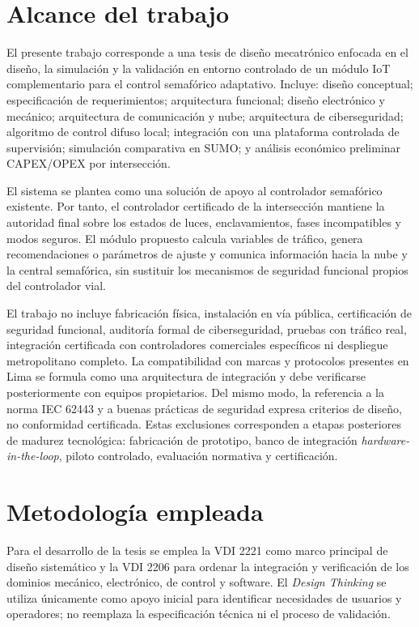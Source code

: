 \section{Alcance del trabajo}\label{sec:alcance}

El presente trabajo corresponde a una tesis de diseño mecatrónico enfocada en el diseño, la simulación y la
validación en entorno controlado de un módulo IoT complementario para el control semafórico adaptativo.
Incluye: diseño conceptual; especificación de requerimientos; arquitectura funcional; diseño electrónico y
mecánico; arquitectura de comunicación y nube; arquitectura de ciberseguridad; algoritmo de control difuso
local; integración con una plataforma controlada de supervisión; simulación comparativa en SUMO; y análisis
económico preliminar CAPEX/OPEX por intersección.

El sistema se plantea como una solución de apoyo al controlador semafórico existente. Por tanto, el
controlador certificado de la intersección mantiene la autoridad final sobre los estados de luces,
enclavamientos, fases incompatibles y modos seguros. El módulo propuesto calcula variables de tráfico,
genera recomendaciones o parámetros de ajuste y comunica información hacia la nube y la central semafórica,
sin sustituir los mecanismos de seguridad funcional propios del controlador vial.

El trabajo no incluye fabricación física, instalación en vía pública, certificación de seguridad funcional,
auditoría formal de ciberseguridad, pruebas con tráfico real, integración certificada con controladores
comerciales específicos ni despliegue metropolitano completo. La compatibilidad con marcas y protocolos
presentes en Lima se formula como una arquitectura de integración y debe verificarse posteriormente con
equipos propietarios. Del mismo modo, la referencia a la norma IEC 62443 y a buenas prácticas de seguridad
expresa criterios de diseño, no conformidad certificada. Estas exclusiones corresponden a etapas posteriores
de madurez tecnológica: fabricación de prototipo, banco de integración \textit{hardware-in-the-loop}, piloto
controlado, evaluación normativa y certificación.

\section{Metodología empleada}\label{sec:metodologia}

Para el desarrollo de la tesis se emplea la VDI 2221 como marco principal de diseño sistemático y la VDI
2206 para ordenar la integración y verificación de los dominios mecánico, electrónico, de control y
software. El \textit{Design Thinking} se utiliza únicamente como apoyo inicial para identificar necesidades
de usuarios y operadores; no reemplaza la especificación técnica ni el proceso de validación.

